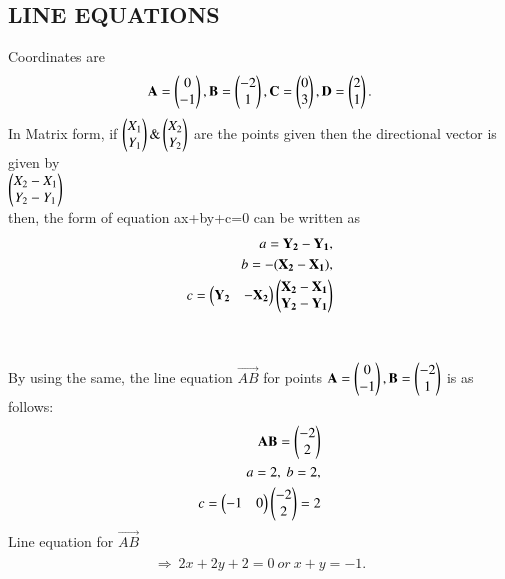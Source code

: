 \documentclass[journal,12pt,twocolumn]{IEEEtran}
\begin{document}
\subsection{LINE EQUATIONS}
Coordinates are
\begin{align}
\begin{split}
\mathbf{A} = \begin{pmatrix}0 \\ -1\end{pmatrix},
\mathbf{B} =\begin{pmatrix}-2\\1\end{pmatrix} ,
\mathbf{C} = \begin{pmatrix}0 \\ 3\end{pmatrix},
\mathbf{D} =\begin{pmatrix}2\\1\end{pmatrix}.
\end{split}
\end{align}
In Matrix form, if $\begin{pmatrix}X_1\\Y_1\end{pmatrix} \&  \begin{pmatrix}X_2\\Y_2\end{pmatrix}$ are the points given then the directional vector is given by \\$\begin{pmatrix}X_2-X_1\\ Y_2-Y_1\end{pmatrix}$ \\then, 
the form of equation ax+by+c=0 can be written as\\ 
\begin{align}
\begin{split}
a= \mathbf{Y_2-Y_1},\\ b=-(\mathbf{X_2-X_1}),\\ c = \begin{pmatrix}\mathbf{Y_2}&-\mathbf{X_2}\end{pmatrix} \begin{pmatrix}\mathbf{X_2-X_1}\\\mathbf{ Y_2-Y_1}\end{pmatrix}
\end{split}
\end{align}
\\
\\
By using the same, the line equation $\vec{AB}$ for points $\mathbf{A} = \begin{pmatrix}0\\-1\end{pmatrix},\mathbf{B}=\begin{pmatrix}-2\\1\end{pmatrix}$ is as follows:
\\
\begin{align}
\begin{split}
\mathbf{AB} = \begin{pmatrix}-2\\2\end{pmatrix}\\
a=2,\ b=2,\\
c=\begin{pmatrix}-1 & 0\end{pmatrix} \begin{pmatrix}-2\\2\end{pmatrix}=2\\
\end{split}
\end{align}
Line equation for $\vec{AB}$
\begin{align}
\begin{split}
\Rightarrow\ 2x+2y+2=0 \ or \ x+y=-1. \\
\end{split}
\end{align}
\end{document}
